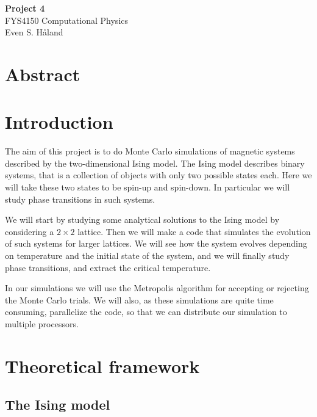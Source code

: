 \documentclass[12pt, a4paper]{article}
\begin{document}
\begin{titlepage}
\begin{center}
\vspace*{3cm}
\Huge
\textbf{Project 4} \\
\Large  
FYS4150 Computational Physics 
\vspace*{3cm} \\ 

Even S. Håland 
\vspace*{5cm} \\

\normalsize
\section*{Abstract}

\end{center}
\end{titlepage}

\section{Introduction}

The aim of this project is to do Monte Carlo simulations of magnetic systems described by the 
two-dimensional Ising model. The Ising model describes binary systems, that is a collection of objects 
with only two possible states each. Here we will take these two states to be spin-up and spin-down. In
particular we will study phase transitions in such systems. 

We will start by studying some analytical solutions to the Ising model by considering a $2\times 2$ 
lattice. Then we will make a code that simulates the evolution of such systems for larger lattices. We 
will see how the system evolves depending on temperature and the initial state of the system, and we 
will finally study phase transitions, and extract the critical temperature.  

In our simulations we will use the Metropolis algorithm for accepting or rejecting the Monte Carlo 
trials. We will also, as these simulations are quite time consuming, parallelize the code, so that 
we can distribute our simulation to multiple processors. 

\section{Theoretical framework}

\subsection{The Ising model}
\end{document}
